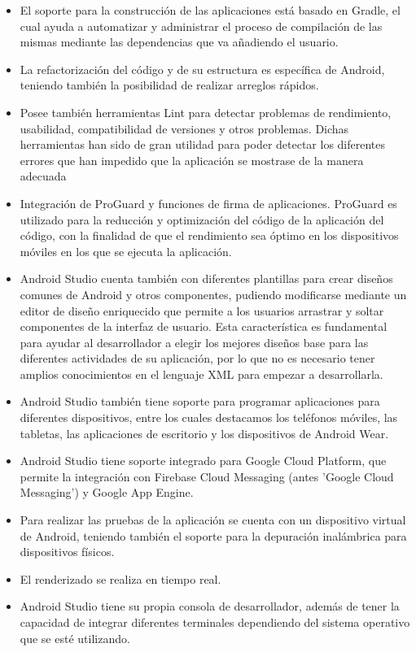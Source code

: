 \begin{itemize}
    \item El soporte para la construcción de las aplicaciones está basado en
    Gradle, el cual ayuda a automatizar y administrar el proceso de compilación
    de las mismas mediante las dependencias que va añadiendo el usuario.
    \item La refactorización del código y de su estructura es específica de
    Android, teniendo también la posibilidad de realizar arreglos rápidos.
    \item Posee también herramientas Lint para detectar problemas de
    rendimiento, usabilidad, compatibilidad de versiones y otros problemas.
    Dichas herramientas han sido de gran utilidad para poder detectar los
    diferentes errores que han impedido que la aplicación se mostrase de la manera adecuada
    \item Integración de ProGuard y funciones de firma de aplicaciones. ProGuard
    es utilizado para la reducción y optimización del código de la aplicación
    del código, con la finalidad de que el rendimiento sea óptimo en los
    dispositivos móviles en los que se ejecuta la aplicación. 
    \item Android Studio cuenta también con diferentes plantillas para crear
    diseños comunes de Android y otros componentes, pudiendo modificarse
    mediante un editor de diseño enriquecido que permite a los usuarios
    arrastrar y soltar componentes de la interfaz de usuario. Esta
    característica es fundamental para ayudar al desarrollador a elegir los
    mejores diseños base para las diferentes actividades de su aplicación, por
    lo que no es necesario tener amplios conocimientos en el lenguaje XML para
    empezar a desarrollarla. 
    \item Android Studio también tiene soporte para programar aplicaciones para
    diferentes dispositivos, entre los cuales destacamos los teléfonos móviles,
    las tabletas, las aplicaciones de escritorio y los dispositivos de Android
    Wear.
    \item Android Studio tiene soporte integrado para Google Cloud Platform, que permite la
    integración con Firebase Cloud Messaging (antes 'Google Cloud Messaging') y
    Google App Engine.
    \item Para realizar las pruebas de la aplicación se cuenta con un
    dispositivo virtual de Android, teniendo también el soporte para la
    depuración inalámbrica para dispositivos físicos.
    \item El renderizado se realiza en tiempo real.
    \item Android Studio tiene su propia consola de desarrollador, además de
    tener la capacidad de integrar diferentes terminales dependiendo del sistema
    operativo que se esté utilizando.
\end{itemize}

